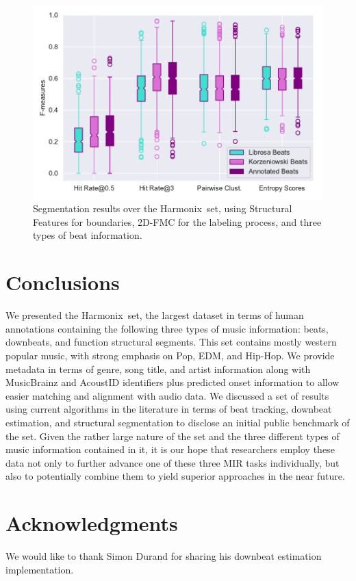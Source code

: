 \documentclass{article}
\newcommand{\setName}{Harmonix}
\begin{document}
\begin{figure}
    \centerline{\includegraphics[width=1.1\columnwidth]{figs/segment_results.pdf}}
    \caption{Segmentation results over the \setName~set, using Structural Features for boundaries, 2D-FMC for the labeling process, and three types of beat information.}
    \label{fig:segment_results}
\end{figure}

\section{Conclusions}\label{sec:conclusions}

We presented the \setName~set, the largest dataset in terms of human annotations containing the following three types of music information: beats, downbeats, and function structural segments.
This set contains mostly western popular music, with strong emphasis on Pop, EDM, and Hip-Hop.
We provide metadata in terms of genre, song title, and artist information along with MusicBrainz and AcoustID identifiers plus predicted onset information to allow easier matching and alignment with audio data.
We discussed a set of results using current algorithms in the literature in terms of beat tracking, downbeat estimation, and structural segmentation to disclose an initial public benchmark of the set.
Given the rather large nature of the set and the three different types of music information contained in it, it is our hope that researchers employ these data not only to further advance one of these three MIR tasks individually, but also to potentially combine them to yield superior approaches in the near future.

\section{Acknowledgments}

We would like to thank Simon Durand for sharing his downbeat estimation implementation.

\balance

\end{document}
